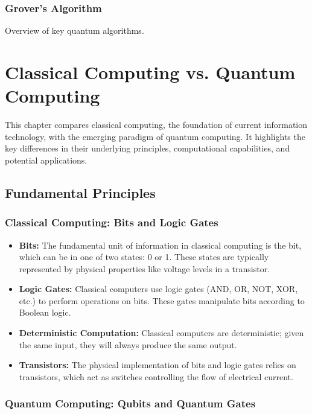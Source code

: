 \documentclass{report}
\begin{document}
\subsection{Grover's Algorithm}
Overview of key quantum algorithms.

\chapter{Classical Computing vs. Quantum Computing}
\label{chap:classical-vs-quantum}

This chapter compares classical computing, the foundation of current information technology, with the emerging paradigm of quantum computing. It highlights the key differences in their underlying principles, computational capabilities, and potential applications.

\section{Fundamental Principles}
\label{sec:fundamental-principles}

\subsection{Classical Computing: Bits and Logic Gates}
\label{subsec:classical-bits-gates}

\begin{itemize}
    \item \textbf{Bits:} The fundamental unit of information in classical computing is the bit, which can be in one of two states: 0 or 1.  These states are typically represented by physical properties like voltage levels in a transistor.
    \item \textbf{Logic Gates:} Classical computers use logic gates (AND, OR, NOT, XOR, etc.) to perform operations on bits. These gates manipulate bits according to Boolean logic.
    \item \textbf{Deterministic Computation:} Classical computers are deterministic; given the same input, they will always produce the same output.
    \item \textbf{Transistors:} The physical implementation of bits and logic gates relies on transistors, which act as switches controlling the flow of electrical current.
\end{itemize}

\subsection{Quantum Computing: Qubits and Quantum Gates}
\label{subsec:quantum-qubits-gates}
\end{document}
